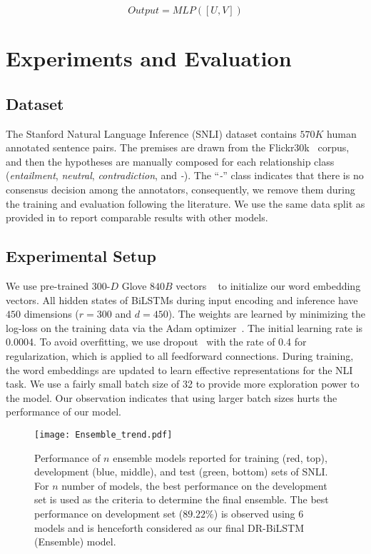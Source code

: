 \documentclass[11pt,a4paper]{article}
\begin{document}
	\begin{equation}
	\textit{Output} = \textit{MLP}([U,V])
	\label{eq:mlp}
	\end{equation}
	
		
\section{Experiments and Evaluation}
	
	\subsection{Dataset} \label{sec:data:snli}
	The Stanford Natural Language Inference (SNLI) dataset contains $570K$ human annotated sentence pairs. The premises are drawn from the Flickr30k~\cite{flickr} corpus, and then the hypotheses are manually composed for each relationship class (\emph{entailment}, \emph{neutral}, \emph{contradiction}, and \emph{-}). The ``\emph{-}'' class indicates that there is no consensus decision among the annotators, consequently, we remove them during the training and evaluation following the literature. We use the same data split as provided in \citet{snli} to report comparable results with other models.	
	
	\subsection{Experimental Setup} \label{sec:exp_s}
	We use pre-trained $300$-$D$ Glove $840B$ vectors ~\cite{glove} to initialize our word embedding vectors. All hidden states of BiLSTMs during input encoding and inference have $450$ dimensions ($r=300$ and $d=450$). The weights are learned by minimizing the log-loss on the training data via the Adam optimizer~\cite{adam}. The initial learning rate is 0.0004. To avoid overfitting, we use dropout~\cite{dropout} with the rate of 0.4 for regularization, which is applied to all feedforward connections. During training, the word embeddings are updated to learn effective representations for the NLI task. We use a fairly small batch size of 32 to provide more exploration power to the model. Our observation indicates that using larger batch sizes hurts the performance of our model. 
	
	\begin{figure}[ht]
		\centering
		\texttt{[image: Ensemble\_trend.pdf]}
		\caption{Performance of $n$ ensemble models reported for training (red, top), development (blue, middle), and test (green, bottom) sets of SNLI. For $n$ number of models, the best performance on the development set is used as the criteria to determine the final ensemble. The best performance on development set ($89.22\%$) is observed using 6 models and is henceforth considered as our final DR-BiLSTM (Ensemble) model. \label{fig:ensemble}}
	\end{figure}
	
\end{document}
